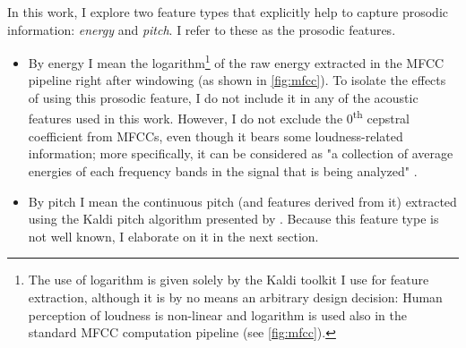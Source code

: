 \documentclass[bsc,frontabs,twoside,singlespacing,parskip,deptreport]{infthesis}
\begin{document}
{{{      %
      In this work, I explore two feature types that explicitly help to capture prosodic information: \textit{energy} and \textit{pitch}. I refer to these as the prosodic features.
      \begin{itemize}
        \item {By energy I mean the logarithm\footnote{The use of logarithm is given solely by the Kaldi toolkit I use for feature extraction, although it is by no means an arbitrary design decision: Human perception of loudness is non-linear and logarithm is used also in the standard MFCC computation pipeline (see \autoref{fig:mfcc}).} of the raw energy extracted in the MFCC pipeline right after windowing (as shown in \autoref{fig:mfcc}). To isolate the effects of using this prosodic feature, I do not include it in any of the acoustic features used in this work. However, I do not exclude the 0\textsuperscript{th} cepstral coefficient from MFCCs, even though it bears some loudness-related information; more specifically, it can be considered as "a collection of average energies of each frequency bands in the signal that is being analyzed" \citep{Zheng_and_Zhang_2000}.}
        \item {By pitch I mean the continuous pitch (and features derived from it) extracted using the Kaldi pitch algorithm presented by \citeauthor{Ghahremani_et_al_2014}. Because this feature type is not well known, I elaborate on it in the next section.}
      \end{itemize}
    }
}}
\end{document}
